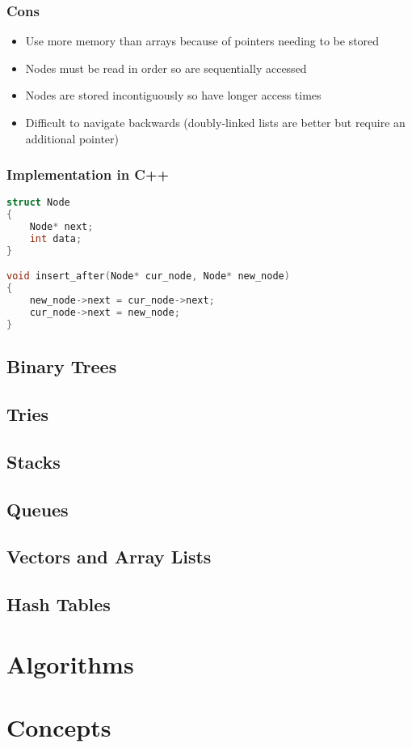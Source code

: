 \documentclass{article}
\begin{document}
\subsubsection{Cons}
\begin{itemize}
	\item Use more memory than arrays because of pointers needing to be stored
	
	\item Nodes must be read in order so are sequentially accessed
	
	\item Nodes are stored incontiguously so have longer access times
	
	\item Difficult to navigate backwards (doubly-linked lists are better but require an additional pointer)
	
\end{itemize}

\subsubsection{Implementation in C++}

\begin{lstlisting}[language=C++, caption={C++ code using listings}]
struct Node
{
	Node* next;
	int data;
}

void insert_after(Node* cur_node, Node* new_node)
{
	new_node->next = cur_node->next;
	cur_node->next = new_node;
}

\end{lstlisting}


\subsection{Binary Trees}

\subsection{Tries}

\subsection{Stacks}

\subsection{Queues}

\subsection{Vectors and Array Lists	}

\subsection{Hash Tables}

\section{Algorithms}


\section{Concepts}
\end{document}
